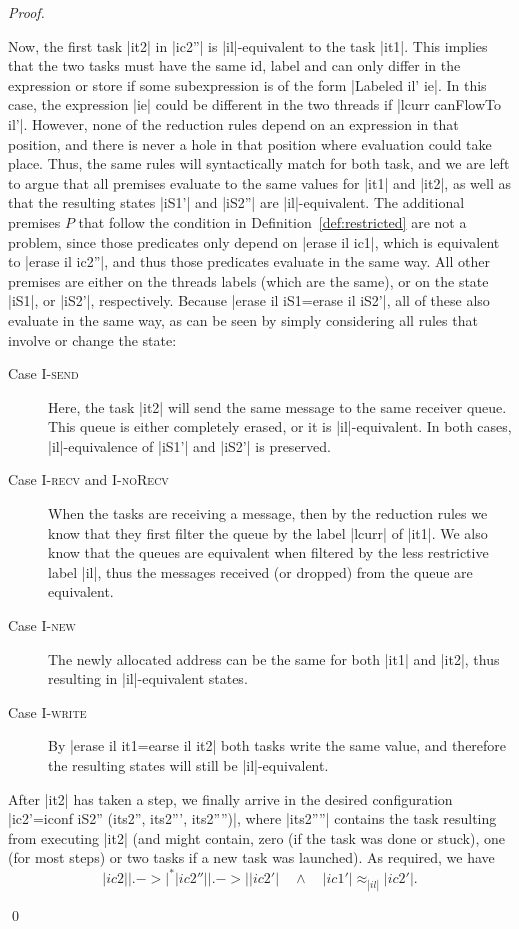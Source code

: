 \begin{proof}
\begin{itemize}
    Now, the first task |it2| in |ic2''| is |il|-equivalent to the task |it1|.
    This implies that the two tasks must have the same id, label and
    can only differ in the expression or store if some subexpression
    is of the form |Labeled il' ie|.  In this case, the expression |ie| could
    be different in the two threads if |lcurr canFlowTo il'|.  However, none of the reduction rules
    depend on an expression in that position, and there is never a
    hole in that position
    where evaluation could take place.  Thus, the same rules will syntactically
    match for both task, and we are left to argue that all premises
    evaluate to the same values for |it1| and |it2|, as well as that
    the resulting states |iS1'| and
    |iS2''| are |il|-equivalent.
    The additional premises $P$ that follow
    the condition in Definition~\ref{def:restricted} are not a problem,
    since those
    predicates only depend on |erase il ic1|, which is equivalent
    to |erase il ic2''|, and thus those predicates evaluate in the same way.
    All other premises are either on the threads labels (which are the same),
    or on the state |iS1|, or |iS2'|, respectively.  Because
    |erase il iS1=erase il iS2'|, all of these also evaluate in the same way,
    as can be seen by simply considering all rules that involve or
    change the state:
    \begin{description}
      \item[Case \textsc{I-send}]
      Here, the task |it2| will send the same message to the same
      receiver queue. This
      queue is either completely erased, or it is |il|-equivalent.  In both
      cases, |il|-equivalence of |iS1'| and |iS2'| is preserved.
      \item[Case \textsc{I-recv} and \textsc{I-noRecv}]
      When the tasks are receiving a message, then by the reduction rules
      we know that they first filter the queue by the label
      |lcurr| of |it1|.  We
      also know that the queues are equivalent when filtered by the less
      restrictive label |il|, thus the messages received (or dropped) from the
      queue are equivalent.
      \item[Case \textsc{I-new}] The newly allocated address can be the same
      for both |it1| and |it2|, thus resulting in |il|-equivalent states.
      \item[Case \textsc{I-write}] By |erase il it1=earse il it2| both tasks
      write the same value, and therefore the resulting states will still
      be |il|-equivalent.
    \end{description}
    After |it2| has taken a step, we finally arrive in the desired
    configuration |ic2'=iconf iS2'' (its2'', its2''', its2'''')|, where
    |its2''''| contains the task resulting from executing |it2| (and
    might contain, zero (if the task was done or stuck), one (for most steps) or two tasks if a new task was launched).
    As required, we have
    \[ |ic2| |.->|^* |ic2''| |.->| |ic2'|
    \quad \land \quad |ic1'| \approx_{|il|} |ic2'| \text{.}\]
  \end{itemize}
  \qed
\end{proof}
